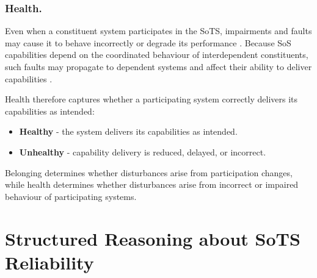 \subsubsection{Health.}
Even when a constituent system participates in the SoTS, impairments and faults may cause it to behave incorrectly or degrade its performance \cite{abbott1990resourceful}. Because SoS capabilities depend on the coordinated behaviour of interdependent constituents, such faults may propagate to dependent systems and affect their ability to deliver capabilities \cite{ferreira2024framework}.

Health therefore captures whether a participating system correctly delivers its capabilities as intended:
\begin{itemize}
    \item \textbf{Healthy} - the system delivers its capabilities as intended.
    \item \textbf{Unhealthy} - capability delivery is reduced, delayed, or incorrect.
\end{itemize}

Belonging determines whether disturbances arise from participation changes, while health determines whether disturbances arise from incorrect or impaired behaviour of participating systems.




\section{Structured Reasoning about SoTS Reliability}



